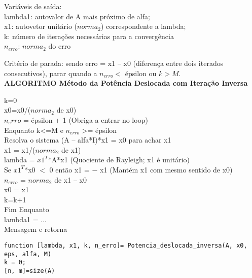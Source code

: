 \documentclass[leqno]{article}
\numberwithin{equation}{section}
\begin{document}
\begin{enumerate}
		\begin{tcolorbox}[colback=red!5,colframe=red!40!black]
		Variáveis de saída:\\
		lambda1: autovalor de A mais próximo de alfa;\\
		x1: autovetor unitário ($norma_2$) correspondente a lambda;\\
		k: número de iterações necessárias para a convergência\\
		$n_{erro}$: $norma_2$ do erro\\
		\end{tcolorbox}
	
		Critério de parada: sendo erro = x1 – x0 (diferença entre dois iterados consecutivos),
		parar quando a $n_{erro} <$ épsilon ou $k > M$.\\
		
		
		
		\textbf{{\large ALGORITMO Método da Potência Deslocada com Iteração Inversa}}\\		
		\begin{tcolorbox}[colback=gray!5,colframe=gray!40!black]
		k=0\\
		x0=x0/($norma_2$ de x0)\\
		$n_erro$ = épsilon + 1 (Obriga a entrar no loop)\\
		Enquanto k<=M e $n_{erro}$ >= épsilon\\
		Resolva o sistema (A – alfa*I)*x1 = x0 para achar x1\\
		x1 = x1/($norma_2$ de x1)\\
		lambda = $x1^T$*A*x1 (Quociente de Rayleigh; x1 é unitário)\\
		Se $x1^T$*x0 $<$ 0 então x1 = − x1 (Mantém x1 com mesmo sentido de x0)\\
		$n_{erro}$ = $norma_2$ de x1 – x0\\
		x0 = x1\\
		k=k+1\\
		Fim Enquanto\\
		lambda1 = ...\\
		Mensagem e retorna\\
		\end{tcolorbox}
		
		\begin{sol}
			\begin{lstlisting}
function [lambda, x1, k, n_erro]= Potencia_deslocada_inversa(A, x0, eps, alfa, M)
k = 0;
[n, m]=size(A)


\end{lstlisting}
\end{sol}
\end{enumerate}
\end{document}
